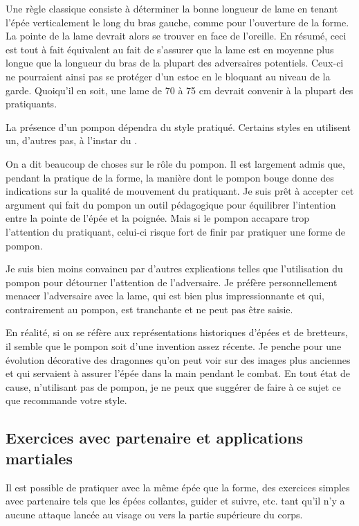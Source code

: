 Une règle classique consiste à déterminer la bonne longueur de lame en tenant l'épée verticalement le long du bras gauche, comme pour l'ouverture de la forme. La pointe de la lame devrait alors se trouver en face de l'oreille. En résumé, ceci est tout à fait équivalent au fait de s'assurer que la lame est en moyenne plus longue que la longueur du bras de la plupart des adversaires potentiels. Ceux-ci ne pourraient ainsi pas se protéger d'un estoc en le bloquant au niveau de la garde.
Quoiqu'il en soit, une lame de 70 à 75 cm devrait convenir à la plupart des pratiquants.

La présence d'un pompon dépendra du style pratiqué. Certains styles en utilisent un, d'autres pas, à l'instar du \Yangjia{} \Michuan{}. 

On a dit beaucoup de choses sur le rôle du pompon. Il est largement admis que, pendant la pratique de la forme, la manière dont le pompon bouge donne des indications sur la qualité de mouvement du pratiquant.
Je suis prêt à accepter cet argument qui fait du pompon un outil pédagogique pour équilibrer l'intention entre la pointe de l'épée et la poignée. Mais si le pompon accapare trop l'attention du pratiquant, celui-ci risque fort de finir par pratiquer une forme de pompon. 

Je suis bien moins convaincu par d'autres explications telles que l'utilisation du pompon pour détourner l'attention de l'adversaire. Je préfère personnellement menacer l'adversaire avec la lame, qui est bien plus impressionnante et qui, contrairement au pompon, est tranchante et ne peut pas être saisie.

En réalité, si on se réfère aux représentations historiques d'épées et de bretteurs, il semble que le pompon soit d'une invention assez récente. Je penche pour une évolution décorative des dragonnes qu'on peut voir sur des images plus anciennes et qui servaient à assurer l'épée dans la main pendant le combat.
En tout état de cause, n'utilisant pas de pompon, je ne peux que suggérer de faire à ce sujet ce que recommande votre style.

\subsection{Exercices avec partenaire et applications martiales}
Il est possible de pratiquer avec la même épée que la forme, des exercices simples avec partenaire tels que les épées collantes, guider et suivre, etc. tant qu'il n'y a aucune attaque lancée au visage ou vers la partie supérieure du corps.

